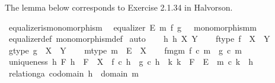 \begin{isabellebody}
\isamarkupfalse%
%
\endisatagproof
{\isafoldproof}%
%
\isadelimproof
%
\endisadelimproof
%
\begin{isamarkuptext}%
The lemma below corresponds to Exercise 2.1.34 in Halvorson.%
\end{isamarkuptext}\isamarkuptrue%
\isamarkupfalse%
\ equalizer{\isacharunderscore}{\kern0pt}is{\isacharunderscore}{\kern0pt}monomorphism{\isacharcolon}{\kern0pt}\isanewline
\ \ {\isachardoublequoteopen}equalizer\ E\ m\ f\ g\ {\isasymLongrightarrow}\ \ monomorphism{\isacharparenleft}{\kern0pt}m{\isacharparenright}{\kern0pt}{\isachardoublequoteclose}\isanewline
%
\isadelimproof
\ \ %
\endisadelimproof
%
\isatagproof
{}\isamarkupfalse%
\ equalizer{\isacharunderscore}{\kern0pt}def\ monomorphism{\isacharunderscore}{\kern0pt}def\isanewline
{}\isamarkupfalse%
\ auto\isanewline
\ \ \isamarkupfalse%
\ h{}\ h{}\ X\ Y\isanewline
\ \ \isamarkupfalse%
\ f{\isacharunderscore}{\kern0pt}type{\isacharcolon}{\kern0pt}\ {\isachardoublequoteopen}f\ {\isacharcolon}{\kern0pt}\ X\ {\isasymrightarrow}\ Y{\isachardoublequoteclose}\isanewline
\ \ \isamarkupfalse%
\ g{\isacharunderscore}{\kern0pt}type{\isacharcolon}{\kern0pt}\ {\isachardoublequoteopen}g\ {\isacharcolon}{\kern0pt}\ X\ {\isasymrightarrow}\ Y{\isachardoublequoteclose}\isanewline
\ \ \isamarkupfalse%
\ m{\isacharunderscore}{\kern0pt}type{\isacharcolon}{\kern0pt}\ {\isachardoublequoteopen}m\ {\isacharcolon}{\kern0pt}\ E\ {\isasymrightarrow}\ X{\isachardoublequoteclose}\isanewline
\ \ \isamarkupfalse%
\ fm{\isacharunderscore}{\kern0pt}gm{\isacharcolon}{\kern0pt}\ {\isachardoublequoteopen}f\ {\isasymcirc}\isactrlsub c\ m\ {\isacharequal}{\kern0pt}\ g\ {\isasymcirc}\isactrlsub c\ m{\isachardoublequoteclose}\isanewline
\ \ \isamarkupfalse%
\ uniqueness{\isacharcolon}{\kern0pt}\ {\isachardoublequoteopen}{\isasymforall}h\ F{\isachardot}{\kern0pt}\ h\ {\isacharcolon}{\kern0pt}\ F\ {\isasymrightarrow}\ X\ {\isasymand}\ f\ {\isasymcirc}\isactrlsub c\ h\ {\isacharequal}{\kern0pt}\ g\ {\isasymcirc}\isactrlsub c\ h\ {\isasymlongrightarrow}\ {\isacharparenleft}{\kern0pt}{\isasymexists}{\isacharbang}{\kern0pt}k{\isachardot}{\kern0pt}\ k\ {\isacharcolon}{\kern0pt}\ F\ {\isasymrightarrow}\ E\ {\isasymand}\ m\ {\isasymcirc}\isactrlsub c\ k\ {\isacharequal}{\kern0pt}\ h{\isacharparenright}{\kern0pt}{\isachardoublequoteclose}\isanewline
\ \ \isamarkupfalse%
\ relation{\isacharunderscore}{\kern0pt}ga{\isacharcolon}{\kern0pt}\ {\isachardoublequoteopen}codomain\ h{}\ {\isacharequal}{\kern0pt}\ domain\ m{\isachardoublequoteclose}\isanewline

\end{isabellebody}
